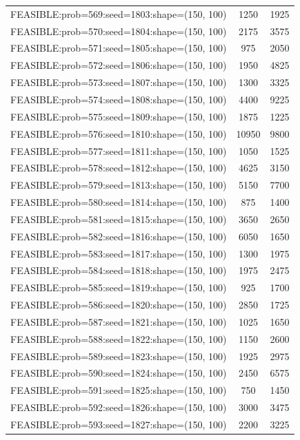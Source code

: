 \begin{longtable}{lcc}
FEASIBLE:prob=569:seed=1803:shape=(150, 100) &     1250 &  1925 \\
FEASIBLE:prob=570:seed=1804:shape=(150, 100) &     2175 &  3575 \\
FEASIBLE:prob=571:seed=1805:shape=(150, 100) &      975 &  2050 \\
FEASIBLE:prob=572:seed=1806:shape=(150, 100) &     1950 &  4825 \\
FEASIBLE:prob=573:seed=1807:shape=(150, 100) &     1300 &  3325 \\
FEASIBLE:prob=574:seed=1808:shape=(150, 100) &     4400 &  9225 \\
FEASIBLE:prob=575:seed=1809:shape=(150, 100) &     1875 &  1225 \\
FEASIBLE:prob=576:seed=1810:shape=(150, 100) &    10950 &  9800 \\
FEASIBLE:prob=577:seed=1811:shape=(150, 100) &     1050 &  1525 \\
FEASIBLE:prob=578:seed=1812:shape=(150, 100) &     4625 &  3150 \\
FEASIBLE:prob=579:seed=1813:shape=(150, 100) &     5150 &  7700 \\
FEASIBLE:prob=580:seed=1814:shape=(150, 100) &      875 &  1400 \\
FEASIBLE:prob=581:seed=1815:shape=(150, 100) &     3650 &  2650 \\
FEASIBLE:prob=582:seed=1816:shape=(150, 100) &     6050 &  1650 \\
FEASIBLE:prob=583:seed=1817:shape=(150, 100) &     1300 &  1975 \\
FEASIBLE:prob=584:seed=1818:shape=(150, 100) &     1975 &  2475 \\
FEASIBLE:prob=585:seed=1819:shape=(150, 100) &      925 &  1700 \\
FEASIBLE:prob=586:seed=1820:shape=(150, 100) &     2850 &  1725 \\
FEASIBLE:prob=587:seed=1821:shape=(150, 100) &     1025 &  1650 \\
FEASIBLE:prob=588:seed=1822:shape=(150, 100) &     1150 &  2600 \\
FEASIBLE:prob=589:seed=1823:shape=(150, 100) &     1925 &  2975 \\
FEASIBLE:prob=590:seed=1824:shape=(150, 100) &     2450 &  6575 \\
FEASIBLE:prob=591:seed=1825:shape=(150, 100) &      750 &  1450 \\
FEASIBLE:prob=592:seed=1826:shape=(150, 100) &     3000 &  3475 \\
FEASIBLE:prob=593:seed=1827:shape=(150, 100) &     2200 &  3225 \\

\end{longtable}
